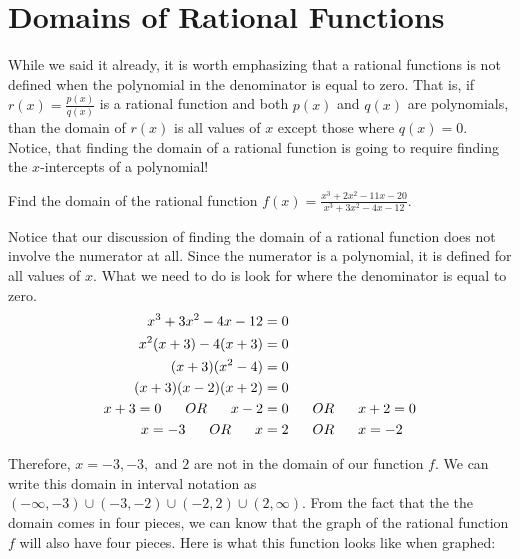 \documentclass{ximera}
\begin{document}
\section{Domains of Rational Functions}

While we said it already, it is worth emphasizing that a rational functions is not defined when the polynomial in the denominator is equal to zero.  That is, if $r(x)=\frac{p(x)}{q(x)}$ is a rational function and both $p(x)$ and $q(x)$ are polynomials, than the domain of $r(x)$ is all values of $x$ except those where $q(x)=0$.  Notice, that finding the domain of a rational function is going to require finding the $x$-intercepts of a polynomial!

\begin{example}
Find the domain of the rational function $f(x)=\frac{x^3+2x^2-11x-20}{x^3+3x^2-4x-12}$.
\begin{explanation}
Notice that our discussion of finding the domain of a rational function does not involve the numerator at all.  Since the numerator is a polynomial, it is defined for all values of $x$.  What we need to do is look for where the denominator is equal to zero.
\begin{align}
x^3+3x^2-4x-12 &= 0 \\
x^2(x+3)-4(x+3) &= 0 \\
(x+3)(x^2-4) &= 0 \\
(x+3)(x-2)(x+2)&=0\\
x+3=0 \hspace{6mm} OR \hspace{6mm} x-2&=0 \hspace{6mm} OR \hspace{6mm} x+2=0\\ 
x=-3 \hspace{6mm}OR \hspace{6mm} x&=2 \hspace{6mm} OR \hspace{6mm} x=-2
\end{align}

Therefore, $x=-3,-3,$ and $2$ are not in the domain of our function $f$.  We can write this domain in interval notation as $(-\infty,-3) \cup (-3,-2) \cup (-2,2) \cup (2,\infty)$.  From the fact that the the domain comes in four pieces, we can know that the graph of the rational function $f$ will also have four pieces. Here is what this function looks like when graphed:

\begin{image}
\end{image}


\end{explanation}
\end{example}
\end{document}
